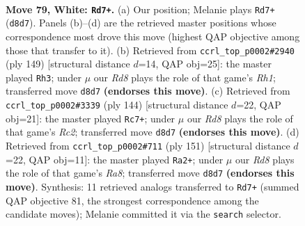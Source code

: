 \documentclass[11pt]{article}
\begin{document}
\clearpage

\begin{figure}[p]\centering
\begin{subfigure}{0.46\textwidth}\centering
\resizebox{\linewidth}{!}{%
\newchessgame
\chessboard[
  setfen={3R4/7k/8/8/p1p5/PrP4p/7P/6K1 w - - 8 79},
  showmover=false,
  pgfstyle=straightmove, color=movearrow, markmove={d8-d7}
]}
\caption{}
\end{subfigure}\hfill
\begin{subfigure}{0.46\textwidth}\centering
\resizebox{\linewidth}{!}{%
\newchessgame
\chessboard[
  setfen={7r/4k3/8/1pR3p1/pP4P1/P7/2K5/8 b - - 0 75},
  showmover=false,
  pgfstyle=straightmove, color=movearrow, markmove={h8-h3}
]}
\caption{}
\end{subfigure}
\\[4pt]
\begin{subfigure}{0.46\textwidth}\centering
\resizebox{\linewidth}{!}{%
\newchessgame
\chessboard[
  setfen={8/5k2/8/4p1p1/6P1/4KP1p/2R4P/7r w - - 15 73},
  showmover=false,
  pgfstyle=straightmove, color=movearrow, markmove={c2-c7}
]}
\caption{}
\end{subfigure}\hfill
\begin{subfigure}{0.46\textwidth}\centering
\resizebox{\linewidth}{!}{%
\newchessgame
\chessboard[
  setfen={8/5pk1/8/5PP1/3R1p2/8/5K2/r7 b - - 0 76},
  showmover=false,
  pgfstyle=straightmove, color=movearrow, markmove={a1-a2}
]}
\caption{}
\end{subfigure}
\caption{\textbf{Move 79, White: \texttt{Rd7+}.} (a) Our position; Melanie plays \texttt{Rd7+} (\texttt{d8d7}). Panels (b)--(d) are the retrieved master positions whose correspondence most drove this move (highest QAP objective among those that transfer to it). (b) Retrieved from \texttt{ccrl\_top\_p0002\#2940} (ply 149) [structural distance $d$=14, QAP obj=25]: the master played \texttt{Rh3}; under $\mu$ our \emph{Rd8} plays the role of that game's \emph{Rh1}; transferred move \texttt{d8d7} \textbf{(endorses this move)}. (c) Retrieved from \texttt{ccrl\_top\_p0002\#3339} (ply 144) [structural distance $d$=22, QAP obj=21]: the master played \texttt{Rc7+}; under $\mu$ our \emph{Rd8} plays the role of that game's \emph{Rc2}; transferred move \texttt{d8d7} \textbf{(endorses this move)}. (d) Retrieved from \texttt{ccrl\_top\_p0002\#711} (ply 151) [structural distance $d$=22, QAP obj=11]: the master played \texttt{Ra2+}; under $\mu$ our \emph{Rd8} plays the role of that game's \emph{Ra8}; transferred move \texttt{d8d7} \textbf{(endorses this move)}. Synthesis: 11 retrieved analogs transferred to \texttt{Rd7+} (summed QAP objective 81, the strongest correspondence among the candidate moves); Melanie committed it via the \texttt{search} selector.}
\label{fig:thought-m156}
\end{figure}
\end{document}
